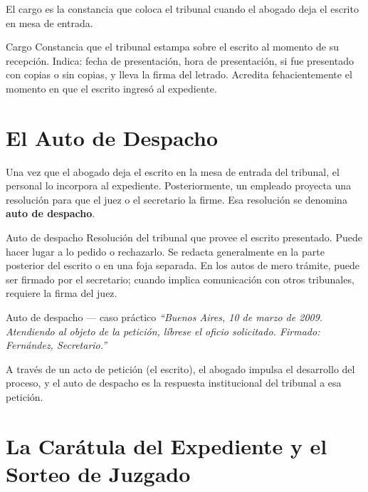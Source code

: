\documentclass[12pt,oneside]{book}
\begin{document}
El cargo es la constancia que coloca el tribunal cuando el abogado deja el escrito en mesa de entrada.

\begin{definition}{Cargo}
Constancia que el tribunal estampa sobre el escrito al momento de su recepción. Indica: fecha de presentación, hora de presentación, si fue presentado con copias o sin copias, y lleva la firma del letrado. Acredita fehacientemente el momento en que el escrito ingresó al expediente.
\end{definition}

\chapter{El Auto de Despacho}

Una vez que el abogado deja el escrito en la mesa de entrada del tribunal, el personal lo incorpora al expediente. Posteriormente, un empleado proyecta una resolución para que el juez o el secretario la firme. Esa resolución se denomina \textbf{auto de despacho}.

\begin{definition}{Auto de despacho}
Resolución del tribunal que provee el escrito presentado. Puede hacer lugar a lo pedido o rechazarlo. Se redacta generalmente en la parte posterior del escrito o en una foja separada. En los autos de mero trámite, puede ser firmado por el secretario; cuando implica comunicación con otros tribunales, requiere la firma del juez.
\end{definition}

\begin{example}{Auto de despacho — caso práctico}
\textit{``Buenos Aires, 10 de marzo de 2009. Atendiendo al objeto de la petición, líbrese el oficio solicitado. Firmado: Fernández, Secretario.''}
\end{example}

A través de un acto de petición (el escrito), el abogado impulsa el desarrollo del proceso, y el auto de despacho es la respuesta institucional del tribunal a esa petición.

\chapter{La Carátula del Expediente y el Sorteo de Juzgado}
\end{document}
